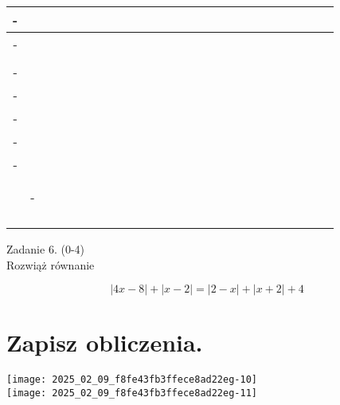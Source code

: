 \documentclass[10pt]{article}
\begin{document}
\begin{center}
\begin{tabular}{|c|c|c|c|c|c|c|c|c|c|c|c|c|c|c|c|c|c|c|c|c|c|c|c|c|}
\hline
- &  &  &  &  &  &  &  &  &  &  &  &  &  &  &  &  &  &  &  &  &  &  &  &  \\
\hline
- &  &  &  &  &  &  &  &  &  &  &  &  &  &  &  &  &  &  &  &  &  &  &  &  \\
\hline
 &  &  &  &  &  &  &  &  &  &  &  &  &  &  &  &  &  &  &  &  &  &  &  &  \\
\hline
- &  &  &  &  &  &  &  &  &  &  &  &  &  &  &  &  &  &  &  &  &  &  &  &  \\
\hline
- &  &  &  &  &  &  &  &  &  &  &  &  &  &  &  &  &  &  &  &  &  &  &  &  \\
\hline
- &  &  &  &  &  &  &  &  &  &  &  &  &  &  &  &  &  &  &  &  &  &  &  &  \\
\hline
- &  &  &  &  &  &  &  &  &  &  &  &  &  &  &  &  &  &  &  &  &  &  &  &  \\
\hline
- &  &  &  &  &  &  &  &  &  &  &  &  &  &  &  &  &  &  &  &  &  &  &  &  \\
\hline
 &  &  &  &  &  &  &  &  &  &  &  &  &  &  &  &  &  &  &  &  &  &  &  &  \\
\hline
 &  &  &  &  &  &  &  &  &  &  &  &  &  &  &  &  &  &  &  &  &  &  &  &  \\
\hline
 & - &  &  &  &  &  &  &  &  &  &  &  &  &  &  &  &  &  &  &  &  &  &  &  \\
\hline
 &  &  &  &  &  &  &  &  &  &  &  &  &  &  &  &  &  &  &  &  &  &  &  &  \\
\hline
 &  &  &  &  &  &  &  &  &  &  &  &  &  &  &  &  &  &  &  &  &  &  &  &  \\
\hline
 &  &  &  &  &  &  &  &  &  &  &  &  &  &  &  &  &  &  &  &  &  &  &  &  \\
\hline
 &  &  &  &  &  &  &  &  &  &  &  &  &  &  &  &  &  &  &  &  &  &  &  &  \\
\hline
\end{tabular}
\end{center}

Zadanie 6. (0-4)\\
Rozwiąż równanie

\[
|4 x-8|+|x-2|=|2-x|+|x+2|+4
\]

\section*{Zapisz obliczenia.}
\texttt{[image: 2025\_02\_09\_f8fe43fb3ffece8ad22eg-10]}\\
\texttt{[image: 2025\_02\_09\_f8fe43fb3ffece8ad22eg-11]}
\end{document}
